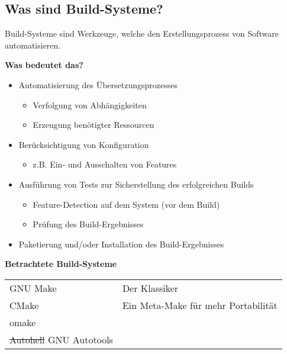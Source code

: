 \subsection{Was sind Build-Systeme?}
\begin{frame}
	\Large
	Build-Systeme sind Werkzeuge, welche den Erstellungsprozess von Software automatisieren.
\end{frame}

\begin{frame}
	\textbf{Was bedeutet das?}
	\begin{itemize}
		\pause
		\item Automatisierung des Übersetzungsprozesses
			\begin{itemize}
				\pause
				\item Verfolgung von Abhängigkeiten
				\pause
				\item Erzeugung benötigter Ressourcen
			\end{itemize}
		\pause
		\item Berücksichtigung von Konfiguration
			\begin{itemize}
			\item z.B. Ein- und Ausschalten von Features
			\end{itemize}
		\pause
		\item Ausführung von Tests zur Sicherstellung des erfolgreichen Builds
		\begin{itemize}
			\pause
			\item Feature-Detection auf dem System (vor dem Build)
			\pause
			\item Prüfung des Build-Ergebnisses
		\end{itemize}
		\pause
		\item Paketierung und/oder Installation des Build-Ergebnisses
	\end{itemize}
\end{frame}

\begin{frame}
	\textbf{Betrachtete Build-Systeme}
	\begin{tabular}{p{8em}p{24em}}
	GNU Make & Der Klassiker \\
	CMake & Ein Meta-Make für mehr Portabilität \\
	omake & \\
	\sout{Autohell} \linebreak GNU Autotools 
	\end{tabular}
\end{frame}
